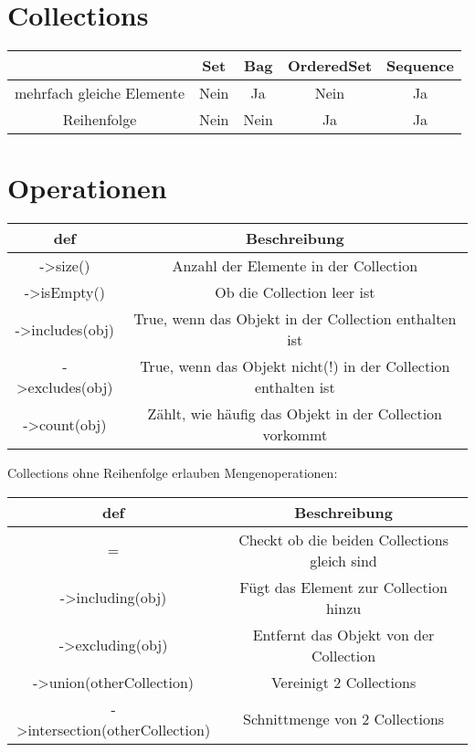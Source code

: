 \documentclass{article}
\begin{document}
	
\section{Collections}
	\begin{center}
		\begin{tabular}{||c c c c c||}
			\hline
			& Set & Bag & OrderedSet & Sequence  \\ [0.5ex]
			\hline\hline
			mehrfach gleiche Elemente & Nein & Ja & Nein & Ja\\
			Reihenfolge & Nein & Nein & Ja & Ja\\
			 [1ex]
			\hline
		\end{tabular}
	\end{center}


\section{Operationen}
\begin{center}
    \begin{tabular}{||c c||}
        \hline
        def & Beschreibung  \\ [0.5ex]
        \hline\hline
        ->size() & Anzahl der Elemente in der Collection\\
        
        ->isEmpty() & Ob die Collection leer ist\\
        
        ->includes(obj) & True, wenn das Objekt in der Collection enthalten ist\\
        
        ->excludes(obj) & True, wenn das Objekt nicht(!) in der Collection enthalten ist\\
        
        ->count(obj) & Zählt, wie häufig das Objekt in der Collection vorkommt\\ [1ex]
        \hline
    \end{tabular}
\end{center}

Collections ohne Reihenfolge erlauben Mengenoperationen:
\begin{center}
	\begin{tabular}{||c c||}
		\hline
		def & Beschreibung  \\ [0.5ex]
		\hline\hline
		= & Checkt ob die beiden Collections gleich sind\\

		->including(obj) & Fügt das Element zur Collection hinzu\\

		->excluding(obj) & Entfernt das Objekt von der Collection\\

		->union(otherCollection) & Vereinigt 2 Collections\\

		->intersection(otherCollection) & Schnittmenge von 2 Collections\\ [1ex]
		\hline
	\end{tabular}
\end{center}
\end{document}

